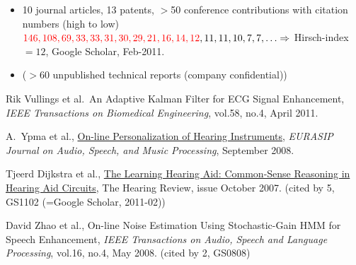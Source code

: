 
{}

\begin{itemize}
\item 10 journal articles, 13 patents, $>$50 conference contributions with  citation numbers (high to low) ${\color{red}146,108,69,33,33,31,30,29,21,16,14,12},11,11,10,7,7,\ldots \Rightarrow$ Hirsch-index $= 12$, Google Scholar, Feb-2011.
\item ($>$60 unpublished technical reports (company confidential))
\end{itemize}



\begin{etaremune}

\item Rik Vullings et al.\, An Adaptive Kalman Filter for ECG Signal Enhancement, \emph{IEEE Transactions on Biomedical Engineering}, vol.58, no.4, April 2011.


\item A.\ Ypma et al., \href{http://www.hindawi.com/GetArticle.aspx?doi=10.1155/2008/183456}{On-line Personalization of Hearing Instruments}, \emph{EURASIP Journal on Audio, Speech, and Music Processing}, September 2008.

\item  Tjeerd Dijkstra et al., \href{http://www.hearingreview.com/issues/articles/2007-10_05.asp}{The Learning Hearing Aid: Common-Sense Reasoning in Hearing Aid Circuits}, The Hearing Review, issue October 2007. (cited by 5, GS1102 (=Google Scholar, 2011-02))


\item David Zhao et al., On-line Noise Estimation Using Stochastic-Gain HMM for Speech Enhancement, \emph{IEEE Transactions on Audio, Speech and Language Processing}, vol.16, no.4, May 2008. (cited by 2, GS0808)


\end{etaremune}
